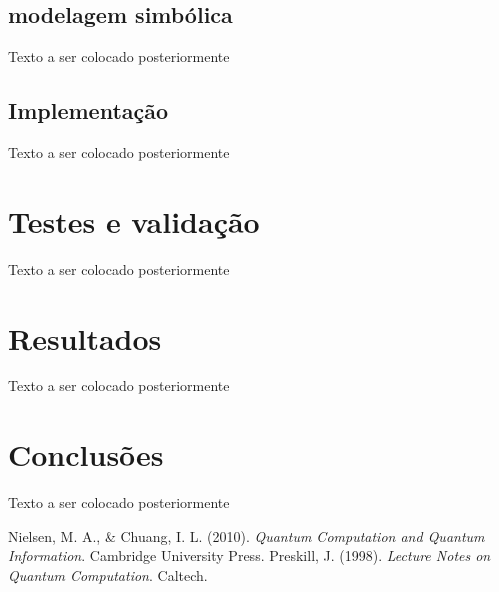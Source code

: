 \documentclass[12pt, a4paper]{article}
\begin{document}
\subsection{modelagem simbólica}
\label{sec:modelagem}
Texto a ser colocado posteriormente

\subsection{Implementação}
\label{sec:implementacao}
Texto a ser colocado posteriormente

\section{Testes e validação}
\label{sec:testes_validacao}
Texto a ser colocado posteriormente

\section{Resultados}
\label{sec:resultados}
Texto a ser colocado posteriormente

\section{Conclusões}
\label{sec:conclusoes}
Texto a ser colocado posteriormente

\begin{thebibliography}{9}
 Nielsen, M. A., \& Chuang, I. L. (2010). \textit{Quantum Computation and Quantum Information}. Cambridge University Press.
 Preskill, J. (1998). \textit{Lecture Notes on Quantum Computation}. Caltech.
\end{thebibliography}
\end{document}
